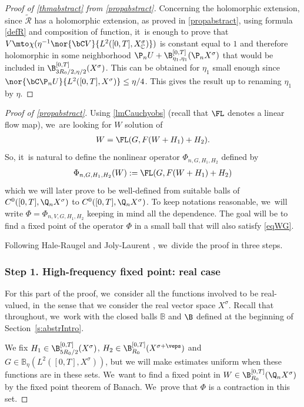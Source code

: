 \begin{proof}[Proof of \cref{thmabstract} from \cref{propabstract}]
Concerning the holomorphic extension, since $\mathcal{\widetilde{R}}$ has a holomorphic extension, as proved in \cref{propabstract}, using formula \eqref{defR} and composition of function, it~is enough to prove that $V\mto \chi(\eta^{-1} \nor{\bC V}{L^{2}([0,T],X^{\sigma}_{\mathbb{C}})})$ is constant equal to $1$ and therefore holomorphic in some neighborhood $\P_nU+ \B_{\eta_{1},\eta_{1}}^{[0,T]}(\P_n X^{\sigma})$ that would be included in $\B_{3R_0/2,\eta/2}^{[0,T]}(X^{\sigma})$. This can be obtained for $\eta_{1}$ small enough since $ \nor{\bC \P_n U}{L^{2}([0,T],X^{\sigma})}\leq \eta/4$. This gives the result up to renaming $\eta_{1}$ by $\eta$.
\end{proof}

\begin{proof}[Proof of \cref{propabstract}]
Using \cref{lmCauchyobs} (recall that $\FL$ denotes a linear flow map), we~are looking for $W$ solution of\vspace*{-3pt}
\begin{align*}
W=\FL (G,F(W+H_{1})+H_{2}).
\end{align*}
So, it~is natural to define the nonlinear operator $\Phi_{n,G,H_{1},H_{2}}$ defined by\vspace*{-3pt}
\begin{align}\label{defPhi}
\Phi_{n,G,H_{1},H_{2}}(W):=\FL (G,F(W+H_{1})+H_{2})
\end{align}
which we will later prove to be well-defined from suitable balls of $C^0([0, T], \Q_n X^\sigma)$ to $C^0([0, T], \Q_n X^\sigma)$. To keep notations reasonable, we~will write $\Phi=\Phi_{n,V,G,H_{1},H_{2}}$ keeping in mind all the dependence. The goal will be to find a fixed point of the operator $\Phi$ in a small ball that will also satisfy \eqref{eqWG}.

Following Hale-Raugel \cite[Th.\,2.14]{HR03} and Joly-Laurent \cite[Th.\,10.1]{2020:joly-laurent:decay-nlw-no-gcc}, we~divide the proof in three steps.

\subsubsection*{Step 1. High-frequency fixed point: real case} For this part of the proof, we~consider all the functions involved to be real-valued, in~the sense that we consider the real vector space $X^{\sigma}$. Recall that throughout, we~work with the closed balls $\mathbb{B}$ and $\B$ defined at the beginning of Section~\ref{s:abstrIntro}.

We fix $H_{1}\in \B_{5R_{0}/2}^{[0,T]}(X^{\sigma})$, $H_{2}\in \B_{R_{0}}^{[0,T]}(X^{\sigma+\veps})$ and $G\in \mathbb{B}_{\eta}(L^2([0, T], X^{\sigma}))$, but we will make estimates uniform when these functions are in these sets. We~want to find a fixed point in $W\in \B_{R_{0}}^{[0,T]}(\Q_n X^{\sigma})$ by the fixed point theorem of Banach. We~prove that $\Phi$ is a contraction in this set.


\end{proof}
